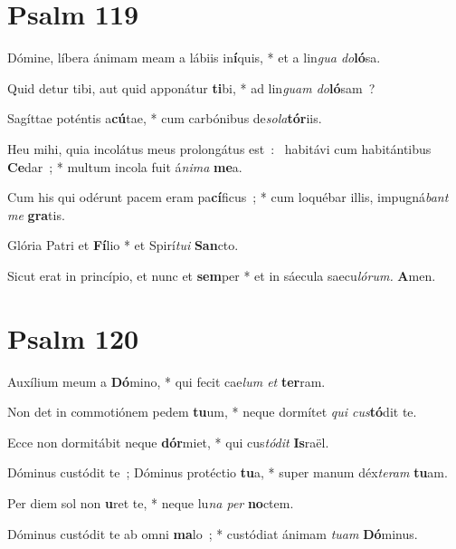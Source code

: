 \documentclass[a5paper, 12pt]{article}
\begin{document}

\section{Psalm 119}



Dómine, líbera ánimam meam a lábiis in\textbf{í}quis, * et a lin\textit{gua do}\textbf{ló}sa.

Quid detur tibi, aut quid apponátur \textbf{ti}bi, * ad lin\textit{guam do}\textbf{ló}sam~?

Sagíttae poténtis a\textbf{cú}tae, * cum carbónibus de\textit{sola}\textbf{tór}iis.

Heu mihi, quia incolátus meus prolongátus est~: \dag\ habitávi cum habitántibus \textbf{Ce}dar~; * 
multum incola fuit á\textit{nima} \textbf{me}a.

Cum his qui odérunt pacem eram pa\textbf{cí}ficus~; * cum loquébar illis, impugná\textit{bant me} \textbf{gra}tis.

Glória Patri et \textbf{Fí}lio * et Spirí\textit{tui} \textbf{San}cto.

Sicut erat in princípio, et nunc et \textbf{sem}per * et in sáecula saecu\textit{lórum.} \textbf{A}men.


\section{Psalm 120}



Auxílium meum a \textbf{Dó}mino, * qui fecit cae\textit{lum et} \textbf{ter}ram.

Non det in commotiónem pedem \textbf{tu}um, * neque dormítet \textit{qui cus}\textbf{tó}dit te.

Ecce non dormitábit neque \textbf{dór}miet, * qui cus\textit{tódit} \textbf{Is}raël.

Dóminus custódit te~; Dóminus protéctio \textbf{tu}a, * super manum déx\textit{teram} \textbf{tu}am.

Per diem sol non \textbf{u}ret te, * neque lu\textit{na per} \textbf{no}ctem.

Dóminus custódit te ab omni \textbf{ma}lo~; * custódiat ánimam \textit{tuam} \textbf{Dó}minus.
\end{document}
